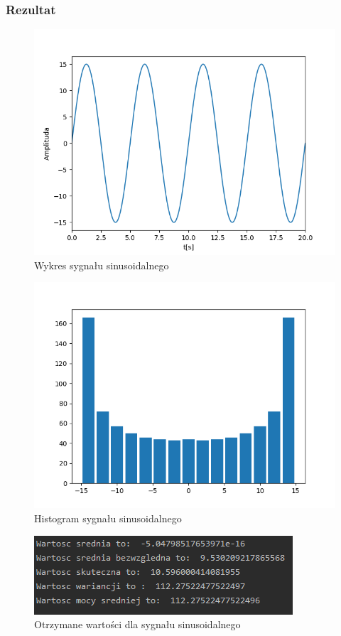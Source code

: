 \documentclass[12pt]{article}
\begin{document}
\subsubsection{Rezultat}
\begin{figure}[H]
\centering
\includegraphics[scale=0.8]{sygSinusWykres.png}
\caption{Wykres sygnału sinusoidalnego}
\end{figure}
\begin{figure}[H]
\centering
\includegraphics[scale=0.8]{sygSinusHist.png}
\caption{Histogram sygnału sinusoidalnego}
\end{figure}
\begin{figure}[H]
\centering
\includegraphics[scale=0.8]{sygSinusParam.png}
\caption{Otrzymane wartości dla sygnału sinusoidalnego}
\end{figure}
\end{document}
